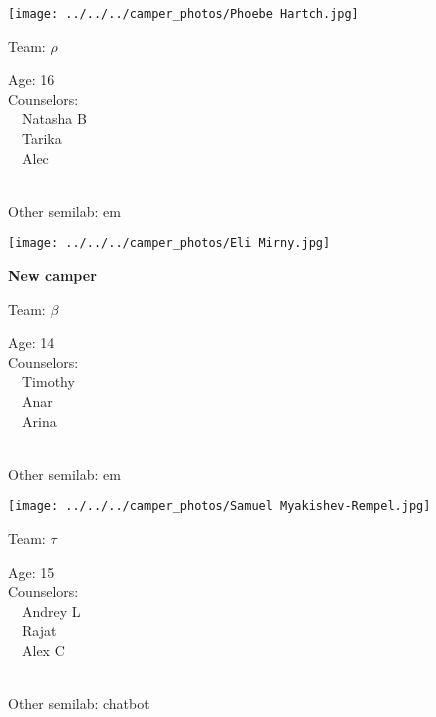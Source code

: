 \documentclass[10pt,letterpaper, landscape]{article}
\begin{document}
\verticalshiftfornextsticker
\renewcommand{\baselinestretch}{1} \begin{sticker}
\noindent\begin{minipage}{0.5\textwidth}\texttt{[image: ../../../camper\_photos/Phoebe Hartch.jpg]}\end{minipage}\begin{minipage}{0.45\textwidth}
Team: {\Large $\rho$}

Age:        16\\
Counselors: \\\ \ Natasha B\\\ \ Tarika\\\ \ Alec\\
\end{minipage} \\ \vspace{0.07in}
Other semilab: em
\end{sticker}
\horizontalshiftfornextsticker
\renewcommand{\baselinestretch}{1} \begin{sticker}
\noindent\begin{minipage}{0.5\textwidth}\texttt{[image: ../../../camper\_photos/Eli Mirny.jpg]}\end{minipage}\begin{minipage}{0.45\textwidth}
\textbf{New camper} 

Team: {\Large $\beta$}

Age:        14\\
Counselors: \\\ \ Timothy\\\ \ Anar\\\ \ Arina\\
\end{minipage} \\ \vspace{0.07in}
Other semilab: em
\end{sticker}
\horizontalshiftfornextsticker
\renewcommand{\baselinestretch}{1} \begin{sticker}
\noindent\begin{minipage}{0.5\textwidth}\texttt{[image: ../../../camper\_photos/Samuel Myakishev-Rempel.jpg]}\end{minipage}\begin{minipage}{0.45\textwidth}
Team: {\Large $\tau$}

Age:        15\\
Counselors: \\\ \ Andrey L\\\ \ Rajat\\\ \ Alex C\\
\end{minipage} \\ \vspace{0.07in}
Other semilab: chatbot
\end{sticker}
\end{document}
